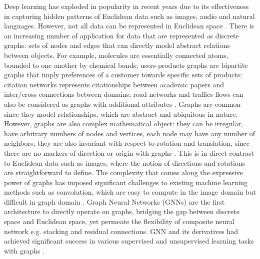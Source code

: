 Deep learning has exploded in popularity in recent years due to its effectiveness in capturing hidden patterns of Euclidean data such as images, audio and natural languages. However, not all data can be represented in Euclidean space \cite{bronsteinGeometricDeepLearning2017}.  There is an increasing number of application for data that are represented as discrete graphs: sets of nodes and edges that can directly model abstract relations between objects. For example, molecules are essentially connected atoms, bounded to one another by chemical bonds; users-products graphs are bipartite graphs that imply preferences of a customer towards specific sets of products; citation networks represents citationships between academic papers and inter/cross connections between domains; road networks and traffics flows can also be considered as graphs with additional attributes \cite{wuComprehensiveSurveyGraph2021}. Graphs are common since they model relationships, which are abstract and ubiquitous in nature. However, graphs are also complex mathematical object: they can be irregular, have arbitrary numbers of nodes and vertices, each node may have any number of neighbors; they are also invariant with respect to rotation and translation, since there are no markers of direction or origin with graphs \cite{bronsteinGeometricDeepLearning2017}. This is in direct contrast to Euclidean data such as images, where the notion of directions and rotations are straightforward to define. The complexity that comes along the expressive power of graphs has imposed significant challenges to existing machine learning methods such as convolution, which are easy to compute in the image domain but difficult in graph domain \cite{wuComprehensiveSurveyGraph2021}. Graph Neural Networks (GNNs) \cite{scarselliGraphNeuralNetwork2009} are the first architecture to directly operate on graphs, bridging the gap between discrete space and Euclidean space, yet permeate the flexibility of composite neural network e.g. stacking and residual connections. GNN and its derivatives had achieved significant success in various supervised and unsupervised learning tasks with graphs \cite{kipfSemiSupervisedClassificationGraph2017, velickovicGraphAttentionNetworks2018}.

